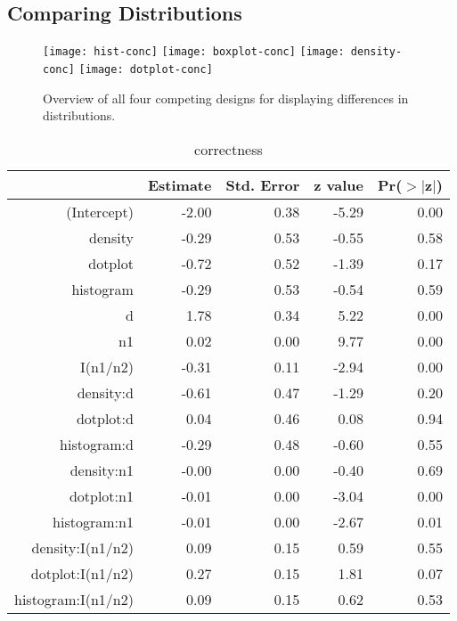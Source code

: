 \subsection{Comparing Distributions}

\begin{figure*} [hbtp]
   \centering
   \texttt{[image: hist-conc]} 
   \texttt{[image: boxplot-conc]} 
   \texttt{[image: density-conc]} 
   \texttt{[image: dotplot-conc]} 
   \caption{Overview of all four competing designs for displaying differences in distributions.}
   \label{fig:expii}
\end{figure*}

\begin{table}[ht]
\begin{center}
\begin{tabular}{rrrrr}
  \hline
 & Estimate & Std. Error & z value & Pr($>$$|$z$|$) \\ 
  \hline
(Intercept) & -2.00 & 0.38 & -5.29 & 0.00 \\ 
  density & -0.29 & 0.53 & -0.55 & 0.58 \\ 
  dotplot & -0.72 & 0.52 & -1.39 & 0.17 \\ 
  histogram & -0.29 & 0.53 & -0.54 & 0.59 \\ 
  d & 1.78 & 0.34 & 5.22 & 0.00 \\ 
  n1 & 0.02 & 0.00 & 9.77 & 0.00 \\ 
  I(n1/n2) & -0.31 & 0.11 & -2.94 & 0.00 \\ 
  density:d & -0.61 & 0.47 & -1.29 & 0.20 \\ 
  dotplot:d & 0.04 & 0.46 & 0.08 & 0.94 \\ 
  histogram:d & -0.29 & 0.48 & -0.60 & 0.55 \\ 
  density:n1 & -0.00 & 0.00 & -0.40 & 0.69 \\ 
  dotplot:n1 & -0.01 & 0.00 & -3.04 & 0.00 \\ 
  histogram:n1 & -0.01 & 0.00 & -2.67 & 0.01 \\ 
  density:I(n1/n2) & 0.09 & 0.15 & 0.59 & 0.55 \\ 
  dotplot:I(n1/n2) & 0.27 & 0.15 & 1.81 & 0.07 \\ 
  histogram:I(n1/n2) & 0.09 & 0.15 & 0.62 & 0.53 \\ 
   \hline
\end{tabular}
\end{center}
\caption{correctness}
\end{table}

